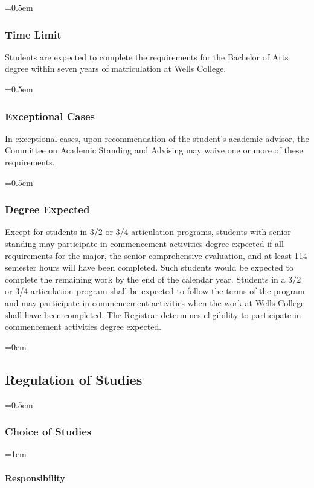 \documentclass{manual}
\let\oldsubsection\subsection
\renewcommand\subsection{\leftskip=0em\oldsubsection}
\let\oldsubsubsection\subsubsection
\renewcommand\subsubsection{\leftskip=0.5em\oldsubsubsection}
\let\oldparagraph\paragraph
\renewcommand\paragraph{\leftskip=1em\oldparagraph}
\begin{document}
\subsubsection{Time Limit}

Students are expected to complete the requirements for the Bachelor of Arts degree within seven years of matriculation at Wells College. 

\subsubsection{Exceptional Cases}

In exceptional cases, upon recommendation of the student's academic advisor, the Committee on Academic Standing and Advising may waive one or more of these requirements.

\subsubsection{Degree Expected}

 Except  for students in 3/2 or 3/4 articulation programs, students with senior standing may participate in commencement activities degree expected if all requirements for the major, the senior comprehensive evaluation, and at least 114 semester hours will have been completed. Such students would be expected to complete the remaining work by the end of the calendar year. Students in a 3/2 or 3/4 articulation program shall be expected to follow the terms of the program and may participate in commencement activities when the work at Wells College shall have been completed. The Registrar determines eligibility to participate in commencement activities degree expected.







\subsection{Regulation of Studies}\label{sec:RegulationOfStudies}

\subsubsection{Choice of Studies}\label{sub:ChoiceOfStudies}

\paragraph{Responsibility}
\end{document}
